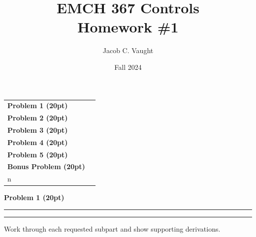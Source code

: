 \documentclass[12pt]{article}
\title{EMCH 367 Controls \\ Homework \#1}
\author{Jacob C. Vaught}
\date{Fall 2024}
\newcommand{\question}[1]{%
  \clearpage
  \vspace{0.5cm}
  {\noindent\normalsize \textbf{#1}}
  \vspace{0.2cm}
  \hrule
  \vspace{0.1cm}
  \hrule
  \vspace{0.3cm}
}
\begin{document}
\maketitle
\setlength{\parindent}{0pt}

\begin{center}
\begin{tcolorbox}[colback=white, colframe=gray!50!black, colbacktitle=gray!20!white,
                  coltitle=black, sharp corners, boxrule=1pt,
                  title=\Large\bfseries Table of Contents]
\begin{tabular}{p{}r}
\textbf{Problem 1 (20pt)} \dotfill & \textbf{\pageref{quest:1}} \\[0.3em]
\textbf{Problem 2 (20pt)} \dotfill & \textbf{\pageref{quest:2}} \\[0.3em]
\textbf{Problem 3 (20pt)} \dotfill & \textbf{\pageref{quest:3}} \\[0.3em]
\textbf{Problem 4 (20pt)} \dotfill & \textbf{\pageref{quest:4}} \\[0.3em]
\textbf{Problem 5 (20pt)} \dotfill & \textbf{\pageref{quest:5}} \\[0.3em]
\textbf{Bonus Problem (20pt)} \dotfill & \textbf{\pageref{quest:6}} \\n\end{tabular}
\vspace{0.2cm}
\end{tcolorbox}
\end{center}


\question{Problem 1 (20pt)}\label{quest:1}
\begin{stepbox}
Work through each requested subpart and show supporting derivations.
\end{stepbox}
\end{document}
